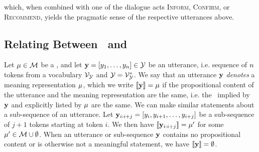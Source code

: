 \noindent which, when combined with one of the dialogue acts \textsc{Inform},
\textsc{Confirm}, or \textsc{Recommend}, yields the pragmatic sense of the
respective utterances above.

\subsection{Relating Between \MeaningRepresentations~and \Utterances}

Let $\mu \in \mathcal{M}$ be a \meaningrepresentation, and let $\mathbf{y} =
\left[y_1,\ldots, y_n \right] \in \mathcal{Y}$ be an
utterance, i.e. sequence of $n$ tokens from a vocabulary $\mathcal{V}_{\mathcal{Y}}$ and
$\mathcal{Y} = \mathcal{V}_{\mathcal{Y}}^*$. We say that an utterance $\mathbf{y}$ \textit{denotes}
a meaning representation $\mu$, which we write $\left\llbracket \mathbf{y} \right\rrbracket = \mu$ if
the propositional content of the utterance and the meaning representation are
the same, i.e. the \attributevalues~implied by $\mathbf{y}$ and explicitly listed
by $\mu$ are the same.  We can make similar statements about a sub-sequence of
an utterance. Let $\mathbf{y}_{i:i+j} = \left[y_i, y_{i+1},\ldots,
y_{i+j} \right]$ be a sub-sequence of $j+1$ tokens starting at token $i$.
We then have $\left\llbracket \mathbf{y}_{i:i+j} \right\rrbracket = \mu^\prime$ for some $\mu^\prime \in
\mathcal{M} \cup \emptyset$.  When an utterance or sub-sequence $\mathbf{y}$
contains no propositional content or is otherwise not a meaningful statement,
we have $\left\llbracket \mathbf{y} \right\rrbracket = \emptyset$.

